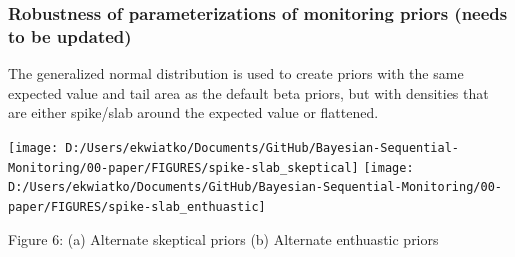 \documentclass[12pt]{article}
\begin{document}
\newpage
\subsubsection{Robustness of parameterizations of monitoring priors (needs to be updated)}
The generalized normal distribution is used to create priors with the same expected value and tail area as the default beta priors, but with densities that are either spike/slab around the expected value or flattened.
\begin{center}
\texttt{[image: D:/Users/ekwiatko/Documents/GitHub/Bayesian-Sequential-Monitoring/00-paper/FIGURES/spike-slab\_skeptical]}
\texttt{[image: D:/Users/ekwiatko/Documents/GitHub/Bayesian-Sequential-Monitoring/00-paper/FIGURES/spike-slab\_enthuastic]}

Figure 6: (a) Alternate skeptical priors (b) Alternate enthuastic priors
\end{center}
\newpage
\end{document}
